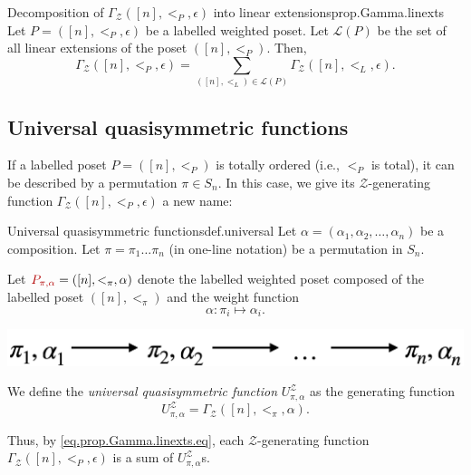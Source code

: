 \documentclass[numbers=enddot,12pt,final,onecolumn,notitlepage]{scrartcl}%
\newcommand{\calZ}{\mathcal{Z}}
\newcommand{\calL}{\mathcal{L}}
\newcommand{\tup}[1]{\left( #1 \right)}
\newcommand{\defn}[1]{{\color{darkred}\emph{#1}}}
\newcommand{\defnm}[1]{{\color{darkred} #1}}
\newcommand{\0}{\phantom{c}}
\let\sumnonlimits\sum
\renewcommand{\sum}{\sumnonlimits\limits}
\begin{document}
\begin{proposition}{Decomposition of $\Gamma_\mathcal{Z}([n], <_P, \epsilon)$ into linear extensions}{prop.Gamma.linexts}
Let $P = ([n], <_P, \epsilon)$ be a labelled weighted poset.
Let $\calL\tup{P}$ be the set of all linear extensions of the poset $([n], <_P)$. Then,
\begin{equation}
\Gamma_\mathcal{Z}([n], <_P, \epsilon)
= \sum_{([n], <_L) \in \calL\tup{P}} \Gamma_\mathcal{Z}([n], <_L, \epsilon) .
\label{eq.prop.Gamma.linexts.eq}
\end{equation}
\end{proposition}
 
\subsection{Universal quasisymmetric functions}

If a labelled poset $P = ([n], <_P)$ is totally ordered (i.e., $<_P$ is total), it can be described by a permutation $\pi \in S_n$. In this case, we give its $\calZ$-generating function $\Gamma_\mathcal{Z}([n], <_P, \epsilon)$ a new name:

\begin{definition}{Universal quasisymmetric functions}{def.universal}
Let $\alpha = (\alpha_1, \alpha_2, \ldots, \alpha_n)$ be a composition.
Let $\pi=\pi_1\dots\pi_n$ (in one-line notation) be a permutation in $S_n$.

Let $\defnm{P_{\pi,\alpha}} = ([n],<_\pi,\alpha)$ denote the labelled weighted poset composed of the labelled poset $([n], <_\pi)$ and the weight function
\[
\alpha : \pi_i \mapsto \alpha_i .
\]
\begin{center}
\includegraphics[scale=0.20]{PosetMonomial.pdf}
 \label{fig : monomial}
 \end{center}
We define the \defn{universal quasisymmetric function} $U^\mathcal{Z}_{\pi,\alpha}$ as the generating function
\begin{equation}
U^\mathcal{Z}_{\pi,\alpha} = \Gamma_\mathcal{Z}([n],<_\pi, \alpha).
\end{equation}
\end{definition}

Thus, by \eqref{eq.prop.Gamma.linexts.eq}, each $\calZ$-generating function $\Gamma_\mathcal{Z}([n], <_P, \epsilon)$ is a sum of $U^\mathcal{Z}_{\pi,\alpha}$s.
\end{document}
